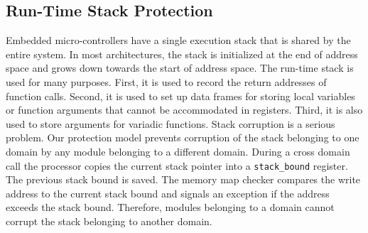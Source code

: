 \subsection{Run-Time Stack Protection}
\label{subsec:stackguard}
%
Embedded micro-controllers have a single execution stack that is shared by the entire system.
%
In most architectures, the stack is initialized at the end of address space and grows down towards the start of address space.
%
The run-time stack is used for many purposes.
%
First, it is used to record the return addresses of function calls.
%
Second, it is used to set up data frames for storing local variables or function arguments that cannot be accommodated in registers.
%
Third, it is also used to store arguments for variadic functions.
%
Stack corruption is a serious problem.
%
Our protection model prevents corruption of the stack belonging to one domain by any module belonging to a different domain.
%
During a cross domain call  the processor copies the current stack pointer into a \texttt{stack\_bound} register. 
%
The previous stack bound is saved.
%
The memory map checker compares the write address to the current stack bound and signals an exception if the address exceeds the stack bound.
%
%
%
Therefore, modules belonging to a domain cannot corrupt the stack belonging to another domain.
%
